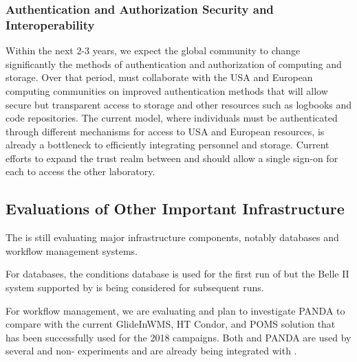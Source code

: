 \subsubsection{Authentication and Authorization Security and Interoperability}\label{ch-comp-auth}

Within the next 2-3 years, we expect the global  community to change significantly the methods of authentication and authorization of computing and storage. 
Over that period,  must collaborate with the USA and European  computing communities on improved authentication methods  that will allow secure but transparent access to storage and other resources such as logbooks and code repositories.  The current model, where individuals must be authenticated through different mechanisms for access to USA and European resources, is already a bottleneck to efficiently integrating personnel and storage. 
Current efforts to expand the trust realm between  and  should allow a single sign-on for each to access the other laboratory.


\subsection{Evaluations of Other Important Infrastructure}

The   is still evaluating major infrastructure components, notably databases and workflow management systems.

For databases\cite{Laycock:2019ynk}, the  conditions database is used for the first run of  but the Belle II\cite{Ritter:2018jxh} system supported by  is being considered for subsequent runs. 

For workflow management, we are evaluating \cite{Falabella:2016waj} and plan to investigate PANDA\cite{Megino:2017ywl} to compare with the current GlideInWMS, HT Condor, and POMS solution that has been successfully used for the 2018  campaigns.
Both  and PANDA are used by several  and non- experiments and are already being integrated with . 
